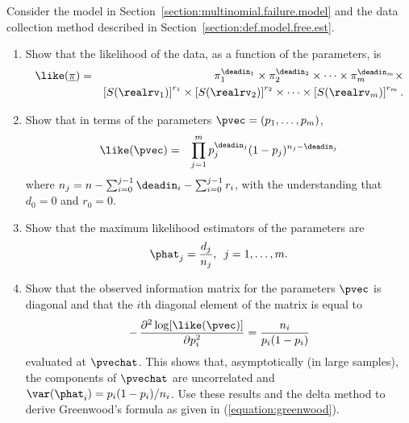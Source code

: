 \begin{exercise1}
\label{exercise:km.ml}
Consider the model in Section~\ref{section:multinomial.failure.model}
and the data collection method described in
Section~\ref{section:def.model.free.est}.  
\begin{enumerate}
\item Show that the likelihood of the data, as a function of the
parameters, is
\begin{eqnarray*}
\like(\underline{\pi})
&=& \pi_{1}^{\deadin_{1}} \times \pi_{2}^{\deadin_{2}} \times
\cdots  \times
\pi_{m}^{\deadin_{m}} \times  \\
& & 
\left [S(\realrv_{1}) \right ]^{r_{1}} \times
\left [S(\realrv_{2}) \right ]^{r_{2}} \times
\cdots
\times
\left [S(\realrv_{m}) \right ]^{r_{m}}.
\end{eqnarray*}
\item 
Show that in
terms of the parameters $\pvec=(p_{1}, \ldots, p_{m})$,
\begin{eqnarray*}
\like(\pvec)
&=&\prod_{j=1}^{m} p_{j}^{\deadin_{j}} (1-p_{j})^{n_{j}-\deadin_{j}}
\end{eqnarray*}
where $n_{j}=n-\sum_{i=0}^{j-1} \deadin_{i} - \sum_{i=0}^{j-1} r_{i}$,
with the understanding that $d_{0}=0$ and $r_{0}=0$.
\item 
Show that the maximum likelihood estimators of the
parameters are
\begin{displaymath}
 \phat_{j}=\frac{d_{j}}{n_{j}}, \,\,\, j=1, \ldots, m.
\end{displaymath}
\item 
Show that the observed information matrix for the parameters $\pvec$
is diagonal and that the $i$th diagonal
element of the matrix is equal to 	
\begin{displaymath}  
- \, \frac{\partial^{2} \log  [ \like(\pvec) ]}
{\partial p_{i}^{2}} = \frac{n_{i}}{p_{i} (1-p_{i})}
\end{displaymath} 
evaluated at $\pvechat$.  This shows that, asymptotically (in large
samples), the components of $\pvechat$ are uncorrelated and
$\var(\phat_{i})=p_{i}(1-p_{i})/n_{i}$. Use these results and the
delta method to derive Greenwood's formula as given in
(\ref{equation:greenwood}).
\end{enumerate}
\end{exercise1}


